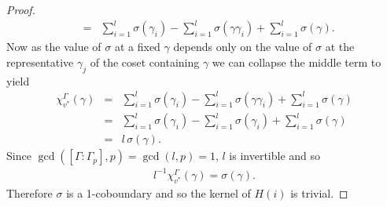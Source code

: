 \begin{proof}
\begin{eqnarray*}
	&=& \sum_{i = 1}^l\sigma(\gamma_i) - \sum_{i = 1}^l \sigma(\gamma\gamma_i) +\sum_{i = 1}^l \sigma(\gamma).
\end{eqnarray*}
Now as the value of $\sigma$ at a fixed $\gamma$ depends only on the value of $\sigma$ at the representative $\gamma_j$ of the coset containing $\gamma$ we can collapse the middle term to yield
\begin{eqnarray*}
	\chi_{v^*}^\Gamma(\gamma) 
	&=& \sum_{i = 1}^l\sigma(\gamma_i) - \sum_{i = 1}^l \sigma(\gamma\gamma_i) +\sum_{i = 1}^l \sigma(\gamma)\\
	&=& \sum_{i = 1}^l\sigma(\gamma_i) - \sum_{i = 1}^l \sigma(\gamma_i) +\sum_{i = 1}^l \sigma(\gamma) \\
	&=& l\, \sigma(\gamma).
\end{eqnarray*}
Since $\gcd([\Gamma:\Gamma_p], p) = \gcd(l,p) = 1$, $l$ is invertible and so
\begin{eqnarray*}
	l^{-1}\chi_{v^*}^\Gamma(\gamma) = \sigma(\gamma).
\end{eqnarray*}
Therefore $\sigma$ is a 1-coboundary and so the kernel of $H(i)$ is trivial.
\end{proof}

